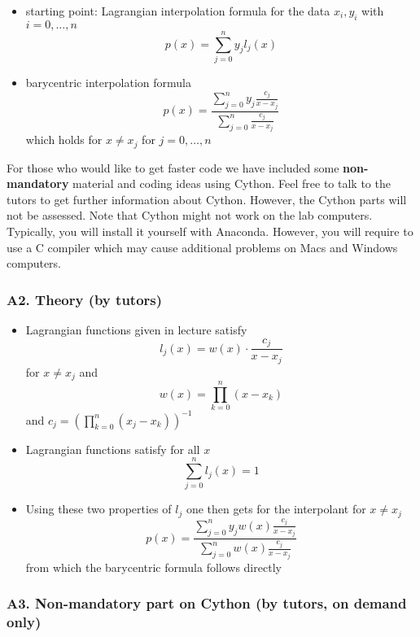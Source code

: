 \documentclass[11pt]{article}
\begin{document}
\begin{itemize}
\item
  starting point: Lagrangian interpolation formula for the data
  \(x_i, y_i\) with \(i=0,\ldots,n\) \[p(x) = \sum_{j=0}^n y_j l_j(x)\]
\item
  barycentric interpolation formula
  \[p(x) = \frac{\sum_{j=0}^n y_j \frac{c_j}{x-x_j}}{\sum_{j=0}^n \frac{c_j}{x-x_j}}\]
  which holds for \(x\neq x_j\) for \(j=0,\ldots,n\)
\end{itemize}

For those who would like to get faster code we have included some
\textbf{non-mandatory} material and coding ideas using Cython. Feel free
to talk to the tutors to get further information about Cython. However,
the Cython parts will not be assessed. Note that Cython might not work
on the lab computers. Typically, you will install it yourself with
Anaconda. However, you will require to use a C compiler which may cause
additional problems on Macs and Windows computers.

    \subsubsection{A2. Theory (by tutors)}\label{a2.-theory-by-tutors}

\begin{itemize}
\item
  Lagrangian functions given in lecture satisfy
  \[l_j(x) = w(x) \cdot \frac{c_j}{x-x_j}\] for \(x\neq x_j\) and
  \[w(x) = \prod_{k=0}^n (x-x_k)\] and
  \(c_j = \left(\prod_{k=0}^n (x_j-x_k)\right)^{-1}\)
\item
  Lagrangian functions satisfy for all \(x\) \[\sum_{j=0}^n l_j(x) = 1\]
\item
  Using these two properties of \(l_j\) one then gets for the
  interpolant for \(x\neq x_j\)
  \[p(x) = \frac{\sum_{j=0}^n y_j w(x) \frac{c_j}{x-x_j}}{\sum_{j=0}^n w(x) \frac{c_j}{x-x_j}}\]
  from which the barycentric formula follows directly
\end{itemize}

    \subsubsection{A3. Non-mandatory part on Cython (by tutors, on demand
only)}\label{a3.-non-mandatory-part-on-cython-by-tutors-on-demand-only}
\end{document}
